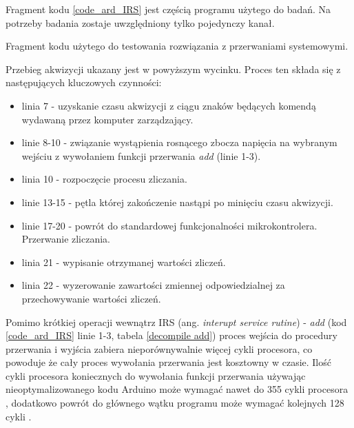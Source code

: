 Fragment kodu \ref{code_ard_IRS} jest częścią programu użytego do badań. Na potrzeby badania zostaje uwzględniony tylko pojedynczy kanał.

\begin{kod}
        
        \caption{Fragment kodu użytego do testowania rozwiązania z przerwaniami systemowymi.}
        \label{code_ard_IRS}
\end{kod}

Przebieg akwizycji ukazany jest w powyższym wycinku. Proces ten składa się z następujących kluczowych czynności:
\begin{itemize}
        \item linia 7 - uzyskanie czasu akwizycji z ciągu znaków będących komendą wydawaną przez komputer zarządzający.
        \item linie 8-10 - związanie wystąpienia rosnącego zbocza napięcia na wybranym wejściu z wywołaniem funkcji przerwania \textit{add} (linie 1-3). 
        \item linia 10 - rozpoczęcie procesu zliczania.
        \item linie 13-15 - pętla której zakończenie nastąpi po minięciu czasu akwizycji.
        \item linie 17-20 - powrót do standardowej funkcjonalności mikrokontrolera. Przerwanie zliczania.
        \item linia 21 - wypisanie otrzymanej wartości zliczeń. 
        \item linia 22 - wyzerowanie zawartości zmiennej odpowiedzialnej za przechowywanie wartości zliczeń.     
\end{itemize}

Pomimo krótkiej operacji wewnątrz IRS (ang. \textit{interupt service rutine}) - \textit{add} (kod \ref{code_ard_IRS} linie 1-3, tabela \ref{decompile add}) proces wejścia do procedury przerwania i wyjścia zabiera nieporównywalnie więcej cykli procesora, co powoduje że cały proces wywołania przerwania jest kosztowny w czasie. 
Ilość cykli procesora koniecznych do wywołania funkcji przerwania używając nieoptymalizowanego kodu Arduino może wymagać nawet do 355 cykli procesora \cite{ard_opt_git}, dodatkowo powrót do głównego wątku programu może wymagać kolejnych 128 cykli \cite{ard_opt_git}.

